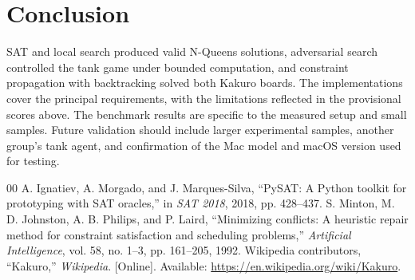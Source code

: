\documentclass[conference]{IEEEtran}
\begin{document}
\section{Conclusion}
SAT and local search produced valid N-Queens solutions, adversarial search controlled the tank game under bounded computation, and constraint propagation with backtracking solved both Kakuro boards. The implementations cover the principal requirements, with the limitations reflected in the provisional scores above. The benchmark results are specific to the measured setup and small samples. Future validation should include larger experimental samples, another group's tank agent, and confirmation of the Mac model and macOS version used for testing.
\begin{thebibliography}{00}
     A. Ignatiev, A. Morgado, and J. Marques-Silva, ``PySAT: A Python toolkit for prototyping with SAT oracles,'' in \emph{SAT 2018}, 2018, pp. 428--437.
     S. Minton, M. D. Johnston, A. B. Philips, and P. Laird, ``Minimizing conflicts: A heuristic repair method for constraint satisfaction and scheduling problems,'' \emph{Artificial Intelligence}, vol. 58, no. 1--3, pp. 161--205, 1992.
     Wikipedia contributors, ``Kakuro,'' \emph{Wikipedia}. [Online]. Available: \url{https://en.wikipedia.org/wiki/Kakuro}.
\end{thebibliography}
\end{document}
